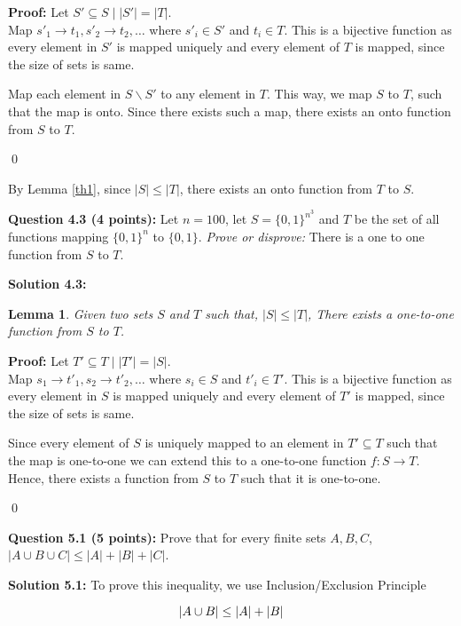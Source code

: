 \documentclass[11pt]{article}
\newtheorem{lemma}[theorem]{Lemma}
\begin{document}
\textbf{Proof:} Let $S' \subseteq S \mid |S'| = |T|$. \\

Map ${s'}_1 \rightarrow t_1, {s'}_2 \rightarrow t_2, \dots$ where 
${s'}_i \in S'$ and $t_i \in T$. This is a bijective function as every
element in $S'$ is mapped uniquely and every element of $T$ is mapped, since
the size of sets is same.

Map each element in $S\backslash S'$ to any element in $T$. This way, we map $S$ to $T$,
such that the map is onto. Since there exists such a map,
there exists an onto function from $S$ to $T$. 

\qed

By Lemma \ref{th1}, since $|S| \le |T|$, there exists an onto
function from $T$ to $S$.

\textbf{Question 4.3 (4 points):} Let \(n=100\), let
\(S = \{0,1\}^{n^3}\) and \(T\) be the set of all functions mapping
\(\{0,1\}^n\) to \(\{0,1\}\). \emph{Prove or disprove:} There is a one
to one function from \(S\) to \(T\).

\textbf{Solution 4.3:}



\begin{lemma}
    \label{th2}
    Given two sets $S$ and $T$ such that, $|S| \le |T|$, There exists a
    one-to-one function from $S$ to $T$.
\end{lemma}

\textbf{Proof:} Let $T' \subseteq T \mid |T'| = |S|$. \\

Map $s_1 \rightarrow {t'}_1, s_2 \rightarrow {t'}_2, \dots$ where 
$s_i \in S$ and ${t'}_i \in T'$. This is a bijective function as every
element in $S$ is mapped uniquely and every element of $T'$ is mapped, since
the size of sets is same.

Since every element of $S$ is uniquely mapped to an element in $T' \subseteq T$
such that the map is one-to-one we can extend this to a one-to-one
function $f: S \rightarrow T$. Hence, there exists a function from $S$ to $T$
such that it is one-to-one.

\qed

\textbf{Question 5.1 (5 points):} Prove that for every finite sets
\(A,B,C\), \(|A \cup B \cup C| \leq |A|+|B|+|C|\).

\textbf{Solution 5.1:} 
To prove this inequality, we use Inclusion/Exclusion Principle

$$
    |A \cup B| \le |A| + |B|\\
$$
\end{document}
